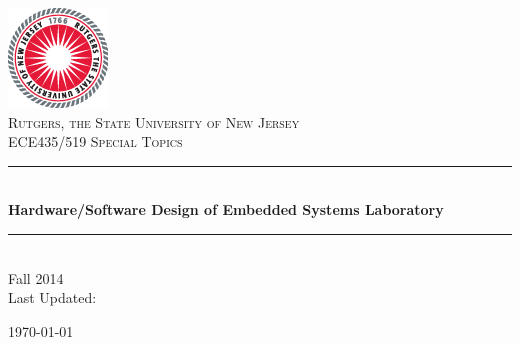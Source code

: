 \documentclass[hidelinks]{article}
\begin{document}
\begin{titlepage}

\newcommand{\HRule}{\rule{\linewidth}{0.5mm}} %

\center %

\includegraphics{RU_INF_SEAL_CMYK}\\[1cm] %

\textsc{\LARGE Rutgers, the State University of New
Jersey}\\[1.5cm] %
\textsc{\Large ECE435/519 Special Topics}\\[0.5cm] %

\HRule \\[0.4cm]
{ \huge \bfseries Hardware/Software Design of Embedded Systems Laboratory}\\[0.4cm] %
\HRule \\[1.5cm]

{\large Fall 2014}\\[3cm] 

Last Updated:

\today
\vfill %

\end{titlepage}

\tableofcontents
\newpage






\newpage



\newpage



\newpage



\newpage


\end{document}
